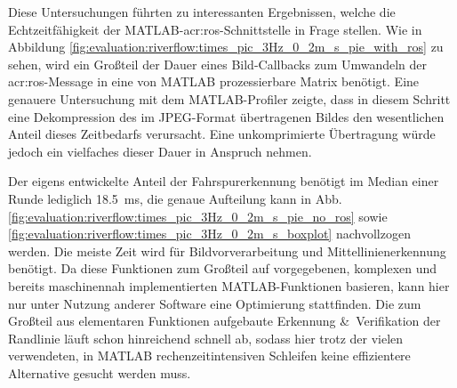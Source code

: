 Diese Untersuchungen führten zu interessanten Ergebnissen, welche die Echtzeitfähigkeit der MATLAB-\gls{acr:ros}-Schnittstelle in Frage stellen. Wie in Abbildung \ref{fig:evaluation:riverflow:times_pic_3Hz_0_2m_s_pie_with_ros} zu sehen, wird ein Großteil der Dauer eines Bild-Callbacks zum Umwandeln der \gls{acr:ros}-Message in eine von MATLAB prozessierbare Matrix benötigt. Eine genauere Untersuchung mit dem MATLAB-Profiler zeigte, dass in diesem Schritt eine Dekompression des im JPEG-Format übertragenen Bildes den wesentlichen Anteil dieses Zeitbedarfs verursacht. Eine unkomprimierte Übertragung würde jedoch ein vielfaches dieser Dauer in Anspruch nehmen.

Der eigens entwickelte Anteil der Fahrspurerkennung benötigt im Median einer Runde lediglich \SI{18,5}{ms}, die genaue Aufteilung kann in Abb. \ref{fig:evaluation:riverflow:times_pic_3Hz_0_2m_s_pie_no_ros} sowie \ref{fig:evaluation:riverflow:times_pic_3Hz_0_2m_s_boxplot} nachvollzogen werden. Die meiste Zeit wird für Bildvorverarbeitung und Mittellinienerkennung benötigt. Da diese Funktionen zum Großteil auf vorgegebenen, komplexen und bereits maschinennah implementierten MATLAB-Funktionen basieren, kann hier nur unter Nutzung anderer Software eine Optimierung stattfinden. Die zum Großteil aus elementaren Funktionen aufgebaute Erkennung \&\ Verifikation der Randlinie läuft schon hinreichend schnell ab, sodass hier trotz der vielen verwendeten, in MATLAB rechenzeitintensiven Schleifen keine effizientere Alternative gesucht werden muss.


